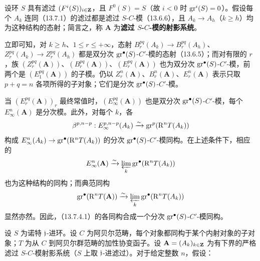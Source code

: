 设环 $S$ 具有滤过 $(F^i(S))_{i\in\mathbf Z}$，且 $F^0(S)=S$（故 $i<0$ 时 $\operatorname{gr}^i(S)=0$）。假设每个 $A_k$ 连同（13.7.1）的滤过都是滤过 $S$-$C$-模（13.6.6），且 $A_k\to A_h$（$k\geq h$）均为这种结构的态射；简言之，称 $\mathbf A$ 为\textbf{滤过 $S$-$C$-模的射影系统}。

立即可知，对 $k\geq h$、$1\leq r\leq+\infty$，态射 $B_r^{pq}(A_k)\to B_r^{pq}(A_h)$、$Z_r^{pq}(A_k)\to Z_r^{pq}(A_h)$ 都是双分次 $\operatorname{gr}^\bullet(S)$-$C'$-模的态射（13.6.5）；而对有限的 $r$，族 $(Z_r^{pq}(\mathbf A))$、$(B_r^{pq}(\mathbf A))$、$(E_r^{pq}(\mathbf A))$ 也为双分次 $\operatorname{gr}^\bullet(S)$-$C'$-模，前两个是 $(E_1^{pq}(\mathbf A))$ 的子模。仍以 $Z_r^n(\mathbf A)$、$B_r^n(\mathbf A)$、$E_r^n(\mathbf A)$ 表示只取 $p+q=n$ 各项所得的子对象；它们是分次 $\operatorname{gr}^\bullet(S)$-$C'$-模。

当 $(E_r^{pq}(\mathbf A))_r$ 最终常值时，$(E_\infty^{pq}(\mathbf A))$ 也是双分次 $\operatorname{gr}^\bullet(S)$-$C'$-模，每个 $E_\infty^n(\mathbf A)$ 是分次模。此外，对每个 $k$，各
\[
\beta^{p,n-p}:E_\infty^{p,n-p}(A_k)\xrightarrow{\sim}\operatorname{gr}^p(\mathrm R^nT(A_k))
\]
构成 $E_\infty^n(A_k)\to\operatorname{gr}^\bullet(\mathrm R^nT(A_k))$ 的分次 $\operatorname{gr}^\bullet(S)$-$C'$-模同构。在上述条件下，相应的
\[
E_\infty^n(\mathbf A)\xrightarrow{\sim}\varprojlim_k\operatorname{gr}^\bullet(\mathrm R^nT(A_k))
\]
也为这种结构的同构；而典范同构
\[
\operatorname{gr}^\bullet(\mathrm R^nT(\mathbf A))\xrightarrow{\sim}\varprojlim_k\operatorname{gr}^\bullet(\mathrm R^nT(A_k))
\]
显然亦然。因此，（13.7.4.1）的各同构合成一个分次 $\operatorname{gr}^\bullet(S)$-$C'$-模同构。

设 $S$ 为诺特 $\mathfrak j$-进环。设 $C$ 为阿贝尔范畴，每个对象都同构于某个内射对象的子对象；$T$ 为从 $C$ 到阿贝尔群范畴的加性协变函子。设 $\mathbf A=(A_k)_{k\in\mathbf Z}$ 为有下界的严格滤过 $S$-$C$-模射影系统（$S$ 上取 $\mathfrak j$-进滤过）。对于给定整数 $n$，假设：

